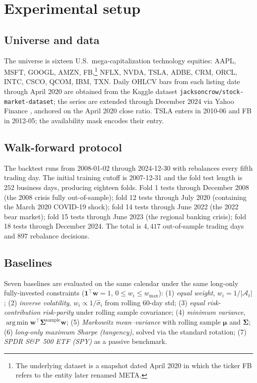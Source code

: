 \documentclass[11pt]{article}
\newcommand{\Sig}{\boldsymbol{\Sigma}}
\newcommand{\bmu}{\boldsymbol{\mu}}
\newcommand{\bw}{\mathbf{w}}
\DeclareMathOperator*{\argmin}{arg\,min}
\begin{document}
\section{Experimental setup}\label{sec:experiments}

\subsection{Universe and data}

The universe is sixteen U.S.\ mega-capitalization technology equities:
AAPL, MSFT, GOOGL, AMZN, FB,\footnote{The underlying dataset is a
snapshot dated April 2020 in which the ticker FB refers to the entity
later renamed META.} NFLX, NVDA, TSLA, ADBE, CRM, ORCL, INTC, CSCO,
QCOM, IBM, TXN. Daily OHLCV bars from each listing date through April
2020 are obtained from the Kaggle dataset
\texttt{jacksoncrow/stock-market-dataset}; the series are extended
through December 2024 via Yahoo Finance \citep{yfinance}, anchored on
the April 2020 close ratio. TSLA enters in 2010-06 and FB in 2012-05;
the availability mask encodes their entry.

\subsection{Walk-forward protocol}\label{sec:wf}

The backtest runs from 2008-01-02 through 2024-12-30 with rebalances
every fifth trading day. The initial training cutoff is 2007-12-31 and
the fold test length is $252$ business days, producing eighteen folds.
Fold 1 tests through December 2008 (the 2008 crisis fully out-of-sample);
fold 12 tests through July 2020 (containing the March 2020 COVID-19
shock); fold 14 tests through June 2022 (the 2022 bear market); fold 15
tests through June 2023 (the regional banking crisis); fold 18 tests
through December 2024. The total is $4{,}417$ out-of-sample trading days
and $897$ rebalance decisions.

\subsection{Baselines}\label{sec:baselines}

Seven baselines are evaluated on the same calendar under the same
long-only fully-invested constraints ($\mathbf{1}^\top\bw = 1$,
$0 \leq w_i \leq w_{\max}$):
(1) \emph{equal weight}, $w_i = 1/|\mathcal{A}_t|$;
(2) \emph{inverse volatility}, $w_i \propto 1/\hat{\sigma}_i$ from
rolling 60-day std;
(3) \emph{equal risk-contribution risk-parity} \citep{maillard2010}
under rolling sample covariance;
(4) \emph{minimum variance}, $\argmin \bw^\top \Sig^{\text{sample}} \bw$;
(5) \emph{Markowitz mean--variance} with rolling sample $\bmu$ and
$\Sig$;
(6) \emph{long-only maximum Sharpe (tangency)}, solved via the
standard rotation;
(7) \emph{SPDR S\&P~500 ETF (SPY)} as a passive benchmark.
\end{document}
